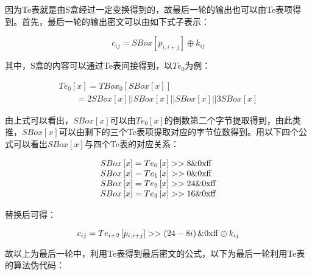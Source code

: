 因为Te表就是由S盒经过一定变换得到的，故最后一轮的输出也可以由Te表项得到。首先，最后一轮的输出密文可以由如下式子表示：

\begin{equation}
	{c_{ij}} = SBox\left[ {{p_{i,i + j}}} \right] \oplus {k_{ij}}
\end{equation}

其中，S盒的内容可以通过Te表间接得到，以$T{e_0}$为例：

\begin{equation}
	\begin{array}{l}
		T{e_0}\left[ x \right] = TBo{x_0}[SBox\left[ x \right]]\\
		\quad \quad  = 2SBox\left[ x \right]||SBox\left[ x \right]||SBox\left[ x \right]||3SBox\left[ x \right]
	\end{array}
\end{equation}

由上式可以看出，$SBox\left[ x \right]$可以由$T{e_0}\left[ x \right]$的倒数第二个字节提取得到，由此类推，$SBox\left[ x \right]$可以由剩下的三个Te表项提取对应的字节位数得到。用以下四个公式可以看出$SBox\left[ x \right]$与四个Te表的对应关系：

\begin{equation}
\begin{array}{l}
	SBox\left[ x \right] = T{e_0}\left[ x \right] >  > 8\& 0{\rm{xff}}\\
	SBox\left[ x \right] = T{e_1}\left[ x \right] >  > 0\& 0{\rm{xff}}\\
	SBox\left[ x \right] = T{e_2}\left[ x \right] >  > 24\& 0{\rm{xff}}\\
	SBox\left[ x \right] = T{e_3}\left[ x \right] >  > 16\& 0{\rm{xff}}
\end{array}
\end{equation}

替换后可得：

\begin{equation}
{c_{ij}} = T{e_{i + 2}}\left[ {{p_{i,i + j}}} \right] >  > \left( {24 - 8i} \right)\& 0{\rm{xff}} \oplus {k_{ij}}
\end{equation}

故以上为最后一轮中，利用Te表得到最后密文的公式，以下为最后一轮利用Te表的算法伪代码：

